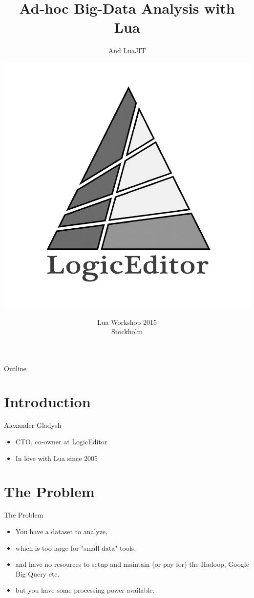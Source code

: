 \documentclass[handout]{beamer}
\title{Ad-hoc Big-Data Analysis with Lua}
\subtitle{And LuaJIT}
\author{\includegraphics[height=.4\textheight]{logo}}
\institute{Alexander Gladysh <ag@logiceditor.com>\newline@agladysh}
\date{Lua Workshop 2015\\Stockholm}
\begin{document}
\maketitle


\begin{frame}{Outline}

\tableofcontents

\end{frame}


\section{Introduction}


\begin{frame}{Alexander Gladysh}

\begin{itemize}
\item CTO, co-owner at LogicEditor
\item In löve with Lua since 2005
\end{itemize}

\end{frame}


\section{The Problem}


\begin{frame}{The Problem}

\begin{itemize}
\item You have a dataset to analyze,
\item which is too large for "small-data" tools,
\item and have no resources to setup and maintain (or pay for)
      the Hadoop, Google Big Query etc.
\item but you have some processing power available.
\end{itemize}

\end{frame}
\end{document}

